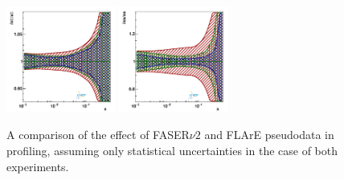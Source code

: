 \begin{figure}[t]
\includegraphics[width=0.32\textwidth]{plots/proton_fasernu2/FASERv2_vs_FLArE10/statOnly_FLArE10_q2_10000_pdf_Sea_ratio.pdf}
\includegraphics[width=0.32\textwidth]{plots/proton_fasernu2/FASERv2_vs_FLArE10/statOnly_FLArE10_q2_10000_pdf_s_ratio.pdf}
\caption{
A comparison of the effect of FASER$\nu2$ and FLArE pseudodata in profiling, 
assuming only statistical uncertainties in the case of both experiments.
}
\label{fig:profiling_FASERv2_vs_FLArE10}
\end{figure}

